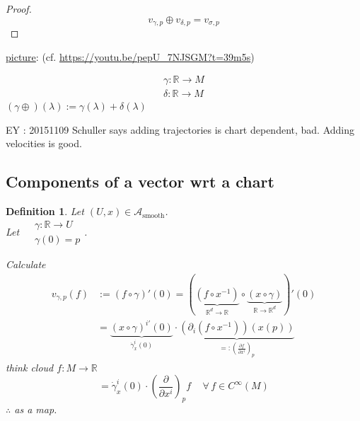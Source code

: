 \documentclass[10pt]{amsart}
\newtheorem{definition}{Definition}
\begin{document}
\begin{multicols*}{2}
\begin{proof}
		\[
		\boxed{ v_{\gamma,p} \oplus v_{\delta,p} = v_{\sigma, p} }
		\]
	\end{proof}
	
	
	
	\underline{picture}: (cf. \url{https://youtu.be/pepU_7NJSGM?t=39m5s})
	
	\[
	\begin{aligned} 
	\gamma : \mathbb{R} \to M \\
	\delta : \mathbb{R} \to M \end{aligned}
	\]
	$(\gamma \oplus)(\lambda) := \gamma(\lambda) + \delta(\lambda)$
	
	EY : 20151109 Schuller says adding trajectories is chart dependent, bad. Adding velocities is good.  
	\subsection{Components of a vector wrt a chart}
	
	\begin{definition}
		Let $(U,x) \in \mathcal{A}_{\text{smooth}}$.  \\
		Let $\begin{aligned} & \gamma : \mathbb{R} \to U \\ 
		& \gamma(0) = p \end{aligned}$.  
		
		Calculate 
		\[
		\begin{aligned} 
		v_{\gamma,p}(f) & := (f \circ \gamma)'(0) = (\underbrace{ (f\circ x^{-1}) }_{\mathbb{R}^d \to \mathbb{R} }  \circ \underbrace{ (x\circ \gamma)}_{\mathbb{R} \to \mathbb{R}^d}  )'(0) \\
		& = \underbrace{ (x\circ \gamma)^{i'}(0) }_{\dot{\gamma}_x^i(0) }  \cdot \underbrace{ (\partial_i(f\circ x^{-1} ) )(x(p))  }_{ =: \left( \frac{ \partial f}{ \partial x^i } \right)_p }
		\end{aligned}
		\]
		think cloud $f:M\to \mathbb{R}$
		\[
		= \boxed{ \dot{\gamma}_x^i(0) \cdot \left( \frac{ \partial }{ \partial x^i} \right)_p } f \quad \, \forall \, f \in C^{\infty}(M)
		\]
		$\therefore$ as a map.  
		

\end{definition}
\end{multicols*}
\end{document}
